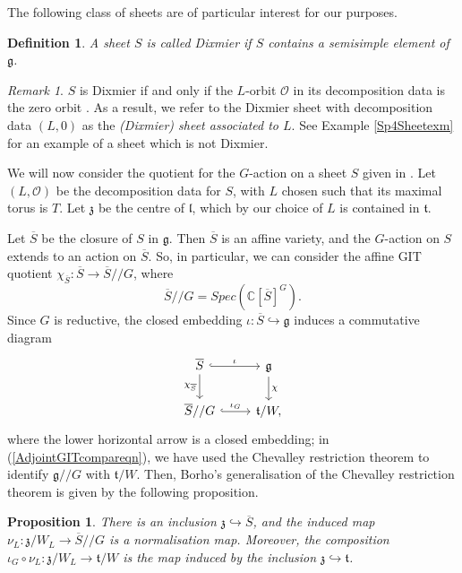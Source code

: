 \documentclass{amsart}
\newtheorem{proposition}[theorem]{Proposition}
\newtheorem{definition}[theorem]{Definition}
\theoremstyle{remark}
\newtheorem{remark}[theorem]{Remark}
\numberwithin{theorem}{section}
\numberwithin{equation}{section}
\begin{document}
The following class of sheets are of particular interest for our purposes.

\begin{definition}\label{DixmierSheetdef}
    A sheet $S$ is called \emph{Dixmier} if $S$ contains a semisimple element of $\mathfrak{g}$.
\end{definition}

\begin{remark}\label{DixmierSheetrmk}
   $S$ is Dixmier if and only if the $L$-orbit $\mathcal O$ in its decomposition data is the zero orbit \cite[4.4]{Borho2}. As a result, we refer to the Dixmier sheet with decomposition data $(L,0)$ as the \emph{(Dixmier) sheet associated to $L$}. See Example \ref{Sp4Sheetexm} for an example of a sheet which is not Dixmier. 
\end{remark}

We will now consider the quotient for the $G$-action on a sheet $S$ given in \cite{Borho2}. Let $(L,\mathcal O)$ be the decomposition data for $S$, with $L$ chosen such that its maximal torus is $T$. Let $\mathfrak{z}$ be the centre of $\mathfrak{l}$, which by our choice of $L$ is contained in $\mathfrak{t}$.

Let $\overline{S}$ be the closure of $S$ in $\mathfrak{g}$. Then $\overline{S}$ is an affine variety, and the $G$-action on $S$ extends to an action on $\overline{S}$. So, in particular, we can consider the affine GIT quotient $\chi_{\overline{S}}:\overline{S} \rightarrow \overline{S}//G$, where
$$\overline{S}//G = Spec(\mathbb{C}[\overline{S}]^G).$$
Since $G$ is reductive, the closed embedding $\iota:\overline{S} \hookrightarrow \mathfrak{g}$ induces a commutative diagram
\begin{equation}\label{AdjointGITcompareqn}
    \begin{tikzcd}
        \overline{S} \arrow[d, "\chi_{\overline{S}}"'] \arrow[r, hook, "\iota"] & \mathfrak{g} \arrow[d, "\chi"] \\
        \overline{S}//G \arrow[r, hook, "\iota_G"]                              & \mathfrak{t}/W,                
    \end{tikzcd}  
\end{equation}
where the lower horizontal arrow is a closed embedding; in (\ref{AdjointGITcompareqn}), we have used the Chevalley restriction theorem to identify $\mathfrak{g}//G$ with $\mathfrak{t}/W$. Then, Borho's generalisation of the Chevalley restriction theorem is given by the following proposition.

\begin{proposition}\label{BorhoChevalleyprp}\cite[Satz 6.3 and Korollar 6.4]{Borho2}
    There is an inclusion $\mathfrak{z} \hookrightarrow \overline{S}$, and the induced map $\nu_L:\mathfrak{z}/W_L \rightarrow \overline{S}//G$ is a normalisation map. Moreover, the composition $\iota_G \circ \nu_L:\mathfrak{z}/W_L \rightarrow \mathfrak{t}/W$ is the map induced by the inclusion $\mathfrak{z} \hookrightarrow \mathfrak{t}$.
\end{proposition}
\end{document}
